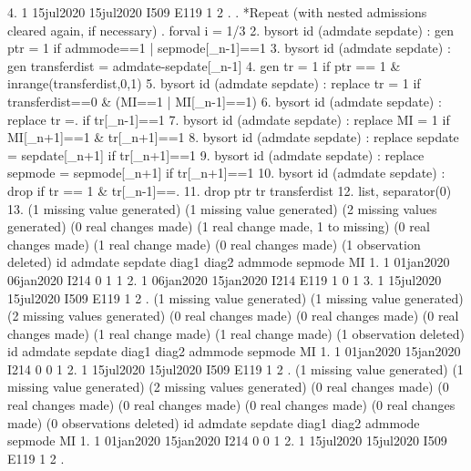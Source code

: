   4. {\VBAR}  1   15jul2020   15jul2020    I509    E119         1         2    . {\VBAR}
     {\BLC}
{\smallskip}
. *Repeat (with nested admissions cleared again, if necessary)
. forval i = 1/3 {\lbr}
  2. bysort id (admdate sepdate) : gen ptr = 1 if admmode==1 | sepmode[_n-1]==1
  3. bysort id (admdate sepdate) : gen transferdist = admdate-sepdate[_n-1]
  4. gen tr = 1 if ptr == 1 \& inrange(transferdist,0,1)
  5. bysort id (admdate sepdate) : replace tr = 1 if transferdist==0 \& (MI==1 | MI[_n-1]==1)
  6. bysort id (admdate sepdate) : replace tr =. if tr[_n-1]==1
  7. bysort id (admdate sepdate) : replace MI = 1 if MI[_n+1]==1 \& tr[_n+1]==1
  8. bysort id (admdate sepdate) : replace sepdate = sepdate[_n+1] if tr[_n+1]==1
  9. bysort id (admdate sepdate) : replace sepmode = sepmode[_n+1] if tr[_n+1]==1
 10. bysort id (admdate sepdate) : drop if tr == 1 \& tr[_n-1]==.
 11. drop ptr tr transferdist
 12. list, separator(0)
 13. {\rbr}
(1 missing value generated)
(1 missing value generated)
(2 missing values generated)
(0 real changes made)
(1 real change made, 1 to missing)
(0 real changes made)
(1 real change made)
(0 real changes made)
(1 observation deleted)
{\smallskip}
     {\TLC}
     {\VBAR} id     admdate     sepdate   diag1   diag2   admmode   sepmode   MI {\VBAR}
     {\LFTT}
  1. {\VBAR}  1   01jan2020   06jan2020    I214                 0         1    1 {\VBAR}
  2. {\VBAR}  1   06jan2020   15jan2020    I214    E119         1         0    1 {\VBAR}
  3. {\VBAR}  1   15jul2020   15jul2020    I509    E119         1         2    . {\VBAR}
     {\BLC}
(1 missing value generated)
(1 missing value generated)
(2 missing values generated)
(0 real changes made)
(0 real changes made)
(0 real changes made)
(1 real change made)
(1 real change made)
(1 observation deleted)
{\smallskip}
     {\TLC}
     {\VBAR} id     admdate     sepdate   diag1   diag2   admmode   sepmode   MI {\VBAR}
     {\LFTT}
  1. {\VBAR}  1   01jan2020   15jan2020    I214                 0         0    1 {\VBAR}
  2. {\VBAR}  1   15jul2020   15jul2020    I509    E119         1         2    . {\VBAR}
     {\BLC}
(1 missing value generated)
(1 missing value generated)
(2 missing values generated)
(0 real changes made)
(0 real changes made)
(0 real changes made)
(0 real changes made)
(0 real changes made)
(0 observations deleted)
{\smallskip}
     {\TLC}
     {\VBAR} id     admdate     sepdate   diag1   diag2   admmode   sepmode   MI {\VBAR}
     {\LFTT}
  1. {\VBAR}  1   01jan2020   15jan2020    I214                 0         0    1 {\VBAR}
  2. {\VBAR}  1   15jul2020   15jul2020    I509    E119         1         2    . {\VBAR}
     {\BLC}
{\smallskip}
